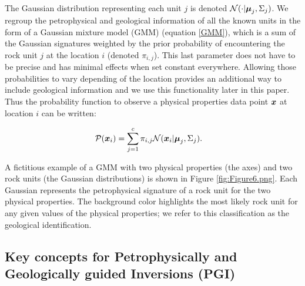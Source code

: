\documentclass[paper, twocolumn]{geophysics} %
\newcommand{\mathbf}[1]{
  \hbox{\mathversion{bold}$#1$}}
\begin{document}
The Gaussian distribution representing each unit $j$ is denoted $\mathcal{N}(\cdot | \mathbf{\mu}_j, \Sigma_j)$. We regroup the petrophysical and geological information of all the known units in the form of a Gaussian mixture model (GMM) (equation \ref{GMM}), which is a sum of the Gaussian signatures weighted by the prior probability of encountering the rock unit $j$ at the location $i$ (denoted $\pi_{i,j}$). This last parameter does not have to be precise and has minimal effects when set constant everywhere. Allowing those probabilities to vary depending of the location provides an additional way to include geological information \citep{Giraud2017} and we use this functionality later in this paper. Thus the probability function to observe a physical properties data point $\mathbf{x}$ at location $i$ can be written:

\begin{align}
&\mathcal{P}(\mathbf{x}_i) = \sum_{j=1}^c \pi_{i,j} \mathcal{N}(\mathbf{x}_i|\mathbf{\mu}_j,\Sigma_j). \label{GMM}
\end{align}

A fictitious example of a GMM with two physical properties (the axes) and two rock units (the Gaussian distributions) is shown in Figure \ref{fig:Figure6.png}. Each Gaussian represents the petrophysical signature of a rock unit for the two physical properties. The background color highlights the most likely rock unit for any given values of the physical properties; we refer to this classification as the geological identification.



\subsection{Key concepts for Petrophysically and Geologically guided Inversions (PGI)}
\end{document}
